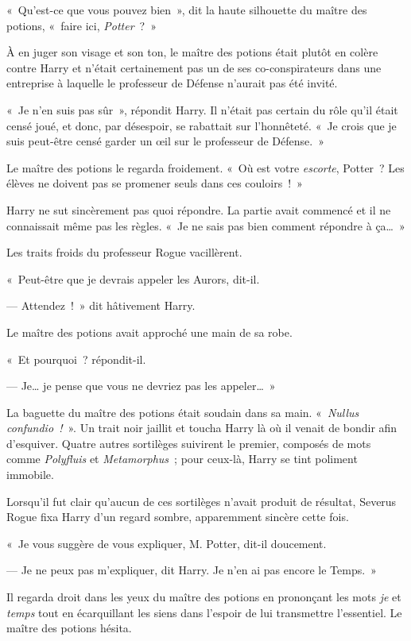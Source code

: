«~Qu'est-ce que vous pouvez bien~», dit la haute silhouette du maître des potions, «~faire ici, \emph{Potter}~?~»

À en juger son visage et son ton, le maître des potions était plutôt en colère contre Harry et n'était certainement pas un de ses co-conspirateurs dans une entreprise à laquelle le professeur de Défense n'aurait pas été invité.

«~Je n'en suis pas sûr~», répondit Harry.
Il n'était pas certain du rôle qu'il était censé joué, et donc, par désespoir, se rabattait sur l'honnêteté.
«~Je crois que je suis peut-être censé garder un œil sur le professeur de Défense.~»

Le maître des potions le regarda froidement.
«~Où est votre \emph{escorte}, Potter~?
Les élèves ne doivent pas se promener seuls dans ces couloirs~!~»

Harry ne sut sincèrement pas quoi répondre.
La partie avait commencé et il ne connaissait même pas les règles.
«~Je ne sais pas bien comment répondre à ça…~»

Les traits froids du professeur Rogue vacillèrent.

«~Peut-être que je devrais appeler les Aurors, dit-il.

--- Attendez~!~»
dit hâtivement Harry.

Le maître des potions avait approché une main de sa robe.

«~Et pourquoi~? répondit-il.

--- Je… je pense que vous ne devriez pas les appeler…~»

La baguette du maître des potions était soudain dans sa main.
«~\emph{Nullus confundio~!}~».
Un trait noir jaillit et toucha Harry là où il venait de bondir afin d'esquiver.
Quatre autres sortilèges suivirent le premier, composés de mots comme \emph{Polyfluis} et \emph{Metamorphus}~; pour ceux-là, Harry se tint poliment immobile.

Lorsqu'il fut clair qu'aucun de ces sortilèges n'avait produit de résultat, Severus Rogue fixa Harry d'un regard sombre, apparemment sincère cette fois.

«~Je vous suggère de vous expliquer, M. Potter, dit-il doucement.

--- Je ne peux pas m'expliquer, dit Harry.
Je n'en ai pas encore le Temps.~»

Il regarda droit dans les yeux du maître des potions en prononçant les mots \emph{je} et \emph{temps} tout en écarquillant les siens dans l'espoir de lui transmettre l'essentiel.
Le maître des potions hésita.

